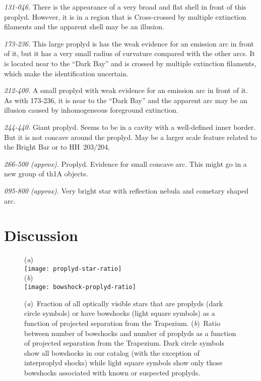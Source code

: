 \documentclass[iop, apj]{emulateapj}
\renewcommand\clearpage{}
\begin{document}
\textit{131-046.}  There is the appearance of a very broad and flat
shell in front of this proplyd.  However, it is in a region that is
Cross-crossed by multiple extinction filaments and the apparent shell
may be an illusion. 


\textit{173-236.} This large proplyd is has the weak evidence for an
emission arc in front of it, but it has a very small radius of
curvature compared with the other arcs.  It is located near to the
``Dark Bay'' \citep{ODell:2000a} and is crossed by multiple extinction
filaments, which make the identification uncertain.

\textit{212-400.}  A small proplyd with weak evidence for an emission
arc in front of it.  As with 173-236, it is near to the ``Dark Bay''
and the apparent arc may be an illusion caused by inhomogeneous
foreground extinction.

\textit{244-440.} Giant proplyd.  Seems to be in a cavity with a
well-defined inner border.  But it is not concave around the proplyd.
May be a larger scale feature related to the Bright Bar or to
HH~203/204.

\textit{266-500 (approx).} Proplyd. Evidence for small concave arc.
This might go in a new group of th1A objects.

\textit{095-800 (approx).} Very bright star with reflection nebula and
cometary shaped arc. 

\label{sec:problematic-group}



\label{sec:notshell}



\clearpage
\section{Discussion}
\label{sec:discuss}
\begin{figure}
  (\textit{a})\\
  \texttt{[image: proplyd-star-ratio]}\\
  (\textit{b})\\
  \texttt{[image: bowshock-proplyd-ratio]}
  \caption{(\textit{a})~Fraction of all optically visible stars that
    are proplyds (dark circle symbols) or have bowshocks (light square
    symbols) as a function of projected separation from the Trapezium.
    (\textit{b})~Ratio between number of bowshocks and number of
    proplyds as a function of projected separation from the Trapezium.
    Dark circle symbols show all bowshocks in our catalog (with the
    exception of interproplyd shocks) while light square symbols show
    only those bowshocks associated with known or suspected proplyds.
  }
  \label{fig:bow-proplyd-star-ratios}
\end{figure}
\end{document}
